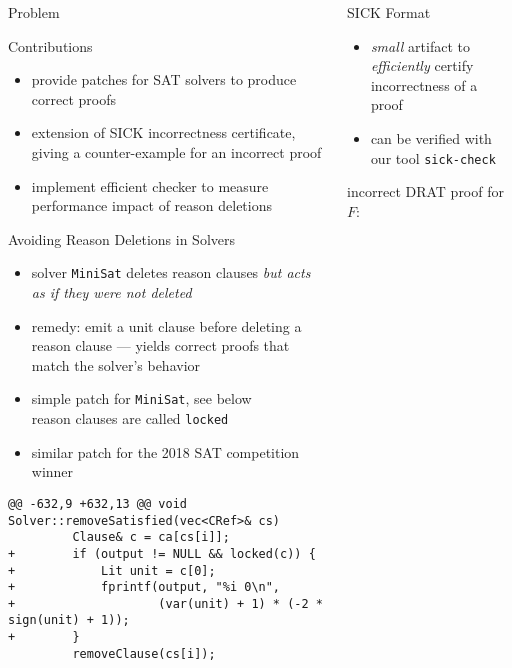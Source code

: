 \documentclass[final,hyperref={pdfpagelabels=true}]{beamer}
\begin{document}
\begin{frame}[fragile]
\begin{columns}[t]
\begin{column}{.45\textwidth}
\begin{block}{Problem}
    \end{block}

    \begin{block}{Contributions}
        \begin{itemize}
		\item provide patches for SAT solvers to produce correct proofs
		\item extension of SICK incorrectness certificate, giving
		a counter-example for an incorrect proof
		\item implement efficient checker to measure performance
		impact of reason deletions
        \end{itemize}
    \end{block}


    \begin{block}{Avoiding Reason Deletions in Solvers}
	\begin{itemize}
	    \item solver \texttt{MiniSat} deletes reason clauses \emph{but
	    acts as if they were not deleted}
            \item remedy: emit a unit clause before deleting a reason clause
            --- yields correct proofs that match the solver's behavior
            \item simple patch for \texttt{MiniSat}, see below\\
            	  reason clauses are called \texttt{locked}
            \item similar patch for the 2018 SAT competition winner
	\end{itemize}
	\vspace{0.5cm}
        {\footnotesize
            \begin{verbatim}
@@ -632,9 +632,13 @@ void Solver::removeSatisfied(vec<CRef>& cs)
         Clause& c = ca[cs[i]];
+        if (output != NULL && locked(c)) {
+            Lit unit = c[0];
+            fprintf(output, "%i 0\n",
+                    (var(unit) + 1) * (-2 * sign(unit) + 1));
+        }
         removeClause(cs[i]);
            \end{verbatim}
        }
    \end{block}
    \end{column}

    \begin{column}{.45\textwidth}
    \begin{block}{SICK Format}
        \begin{itemize}
            \item \emph{small} artifact to \emph{efficiently} certify
            incorrectness of a proof
            \item can be verified with our tool \texttt{sick-check}
        \end{itemize}
        \vspace{.5cm}
        incorrect DRAT proof for $F$:


\end{block}
\end{column}
\end{columns}
\end{frame}
\end{document}
